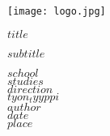 \documentclass[12pt]{extarticle}
\begin{document}

\begin{titlepage}
\thispagestyle{empty}

\vspace*{-2cm}  %
\hspace*{-2.5cm}  %
\texttt{[image: logo.jpg]}
\vspace*{1cm}

\vspace*{2cm}

\begin{center}
    \Huge
    \textbf{$title$}
    
    \vspace{0.5cm}
    
    \Large
    $subtitle$
\end{center}

\vfill

{
\begin{flushright}
    \large
    $school$ \\
    $studies$ \\
    $direction$ \\
    \vspace{1cm}
    $tyon_tyyppi$ \\
    $author$ \\
    \vspace{1cm}
    $date$ \\
    $place$
\end{flushright}
}

\end{titlepage}

\newpage
\thispagestyle{empty}
\end{document}
